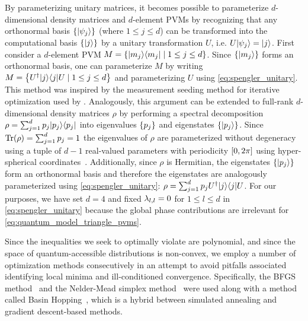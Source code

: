 \documentclass[aps, 10pt, english, twoside, pra, nofootinbib, tightenlines, longbibliography, superscriptaddress]{revtex4-1}
\begin{document}
    By parameterizing unitary matrices, it becomes possible to parameterize $d$-dimensional density matrices and $d$-element PVMs by recognizing that any orthonormal basis $\bc{\ket{\psi_j}}$ (where $1 \leq j \leq d$) can be transformed into the computational basis $\bc{\ket{j}}$ by a unitary transformation $U$, i.e. $U \ket{\psi_j} = \ket{j}$. First consider a $d$-element PVM $M = \bc{\ket{m_j}\bra{m_j} \mid 1 \leq j \leq d}$. Since $\bc{\ket{m_j}}$ forms an orthonormal basis, one can parameterize $M$ by writing $M = \bc{U^{\dagger}\ket{j}\bra{j}U \mid 1 \leq j \leq d}$ and parameterizing $U$ using \cref{eq:spengler_unitary}. This method was inspired by the measurement seeding method for iterative optimization used by \citet{Pal_2010}. Analogously, this argument can be extended to full-rank $d$-dimensional density matrices $\rho$ by performing a spectral decomposition $\rho = \sum_{j=1}^{d} p_j \ket{p_j} \bra{p_j}$ into eigenvalues $\bc{p_j}$ and eigenstates $\bc{\ket{p_j}}$. Since $\Tr\br{\rho} = \sum_{j = 1}^{d} p_j = 1$ the eigenvalues of $\rho$ are parameterized without degeneracy using a tuple of $d-1$ real-valued parameters with periodicity $\bs{0, 2 \pi}$ using hyper-spherical coordinates~\cite{Hedemann_2013, Spengler_2010_Unitary}. Additionally, since $\rho$ is Hermitian, the eigenstates $\bc{\ket{p_j}}$ form an orthonormal basis and therefore the eigenstates are analogously parameterized using \cref{eq:spengler_unitary}: $\rho = \sum_{j=1}^{d} p_j U^{\dagger} \ket{j} \bra{j} U$. For our purposes, we have set $d = 4$ and fixed $\lambda_{l, l} = 0$ for $1 \leq l \leq d$ in \cref{eq:spengler_unitary} because the global phase contributions are irrelevant for \cref{eq:quantum_model_triangle_pvms}.

    Since the inequalities we seek to optimally violate are polynomial, and since the space of quantum-accessible distributions is non-convex, we employ a number of optimization methods consecutively in an attempt to avoid pitfalls associated identifying local minima and ill-conditioned convergence. Specifically, the BFGS method~\cite[p.142]{Nocedal_2000} and the Nelder-Mead simplex method~\cite[p.238]{Nocedal_2000} were used along with a method called Basin Hopping~\cite{Wales_1997}, which is a hybrid between simulated annealing and gradient descent-based methods.
\end{document}
